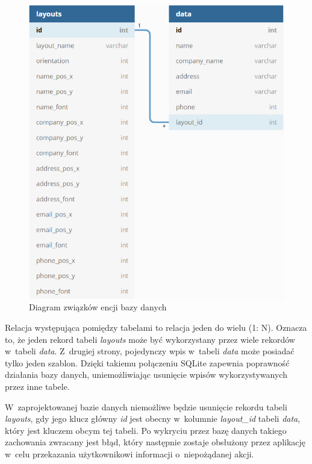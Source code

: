 \documentclass[a4paper,12pt, twoside]{article}
\begin{document}
        \begin{figure}[H]
    	        \centering
    			\includegraphics[width=13cm]{images/rys_11baza.png}
    			\caption{Diagram związków encji bazy danych}
                \label{fig:database}
    	\end{figure}
    	
        Relacja występująca pomiędzy tabelami to relacja jeden do wielu (1: N). Oznacza to, że jeden rekord tabeli \textit{layouts} może być wykorzystany przez wiele rekordów w~tabeli \textit{data}. Z~drugiej strony, pojedynczy wpis w~tabeli \textit{data} może posiadać tylko jeden szablon. Dzięki takiemu połączeniu SQLite zapewnia poprawność działania bazy danych, uniemożliwiając usunięcie wpisów wykorzystywanych przez inne tabele. 
        
        W~zaprojektowanej bazie danych niemożliwe będzie usunięcie rekordu tabeli \textit{layouts}, gdy jego klucz główny \textit{id} jest obecny w~kolumnie \textit{layout\_id} tabeli \textit{data}, który jest kluczem obcym tej tabeli. Po wykryciu przez bazę danych takiego zachowania zwracany jest błąd, który następnie zostaje obsłużony przez aplikację w~celu przekazania użytkownikowi informacji o~niepożądanej akcji.
        
\end{document}
